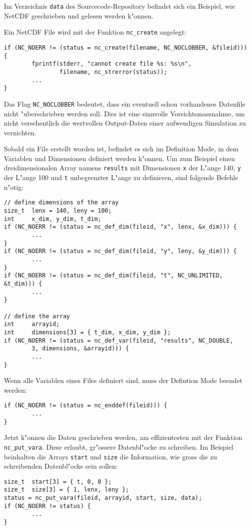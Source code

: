 \begin{beispiel}
Im Verzeichnis {\tt data} des Sourcecode-Repository befindet sich
ein Beispiel, wie NetCDF geschrieben und gelesen werden k"onnen.

Ein NetCDF File wird mit der Funktion \verb+nc_create+ angelegt:
\begin{verbatim}
if (NC_NOERR != (status = nc_create(filename, NC_NOCLOBBER, &fileid))) {
        fprintf(stderr, "cannot create file %s: %s\n",
                filename, nc_strerror(status));
        ...
}
\end{verbatim}
Das Flag \verb+NC_NOCLOBBER+ bedeutet, dass ein eventuell schon vorhandenes
Datenfile nicht "uberschrieben werden soll.
Dies ist eine sinnvolle Vorsichtsmassnahme, um nicht versehentlich
die wertvollen Output-Daten einer aufwendigen Simulation zu vernichten.

Sobald ein File erstellt worden ist, befindet es sich im Definition
Mode, in dem Variablen und Dimensionen definiert werden k"onnen.
Um zum Beispiel einen dreidimensionalen Array namens {\tt results}
mit Dimensionen {\tt x} der L"ange 140, {\tt y} der L"ange 100 und 
{\tt t} unbegrenzter L"ange zu definieren, sind folgende Befehle n"otig:
\begin{verbatim}
// define dimensions of the array
size_t  lenx = 140, leny = 100;
int     x_dim, y_dim, t_dim;
if (NC_NOERR != (status = nc_def_dim(fileid, "x", lenx, &x_dim))) {
        ...
}
if (NC_NOERR != (status = nc_def_dim(fileid, "y", leny, &y_dim))) {
        ...
}
if (NC_NOERR != (status = nc_def_dim(fileid, "t", NC_UNLIMITED, &t_dim))) {
        ...
}

// define the array
int     arrayid;
int     dimensions[3] = { t_dim, x_dim, y_dim };
if (NC_NOERR != (status = nc_def_var(fileid, "results", NC_DOUBLE,
        3, dimensions, &arrayid))) {
        ...
}
\end{verbatim}
Wenn alle Variablen eines Files definiert sind, muss der Defintion
Mode beendet werden:
\begin{verbatim}
if (NC_NOERR != (status = nc_enddef(fileid))) {
        ...
}
\end{verbatim}
Jetzt k"onnen die Daten geschrieben werden, am effizientesten mit der
Funktion \verb+nc_put_vara+. Diese erlaubt, gr"ossere Datenbl"ocke
zu schreiben.
Im Beispiel beinhalten die Arrays {\tt start} und {\tt size}
die Information, wie gross die zu schreibenden Datenbl"ocke
sein sollen:
\begin{verbatim}
size_t  start[3] = { t, 0, 0 };
size_t  size[3] = { 1, lenx, leny };
status = nc_put_vara(fileid, arrayid, start, size, data);
if (NC_NOERR != status) {
        ...
}
\end{verbatim}
\end{beispiel}

